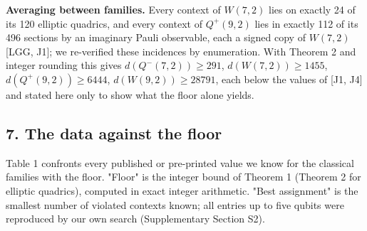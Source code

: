\documentclass[11pt,a4paper]{article}
\begin{document}
\textbf{Averaging between families.} Every context of \(W(7,2)\) lies on exactly 24 of its 120 elliptic
quadrics, and every context of \(Q^+(9,2)\) lies in exactly 112 of its 496 sections by an imaginary Pauli
observable, each a signed copy of \(W(7,2)\) {[}LGG, J1{]}; we re-verified these incidences by enumeration.
With Theorem 2 and integer rounding this gives \(d(Q^-(7,2)) \ge 291\), \(d(W(7,2)) \ge 1455\),
\(d(Q^+(9,2)) \ge 6444\), \(d(W(9,2)) \ge 28791\), each below the values of {[}J1, J4{]} and stated here only to
show what the floor alone yields.

\subsection{7. The data against the floor}\label{7-the-data-against-the-floor}

Table 1 confronts every published or pre-printed value we know for the classical families with the
floor. "Floor" is the integer bound of Theorem 1 (Theorem 2 for elliptic quadrics), computed in exact
integer arithmetic. "Best assignment" is the smallest number of violated contexts known; all entries up
to five qubits were reproduced by our own search (Supplementary Section S2).
\end{document}
